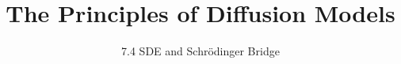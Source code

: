
\title{The Principles of Diffusion Models}
\subtitle{7.4 SDE and Schrödinger Bridge}


\begin{frame}
    \titlepage
\end{frame}


